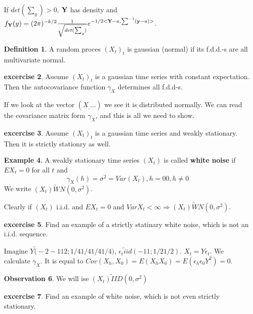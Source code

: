 \documentclass[12pt,a4paper]{amsart}
\theoremstyle{definition} %
\newtheorem{defn}{Definition}[section]
\newtheorem{example}[defn]{Example}
\newtheorem{excercise}[defn]{excercise}
\newtheorem{observation}[defn]{Observation}
\theoremstyle{plain} %
\begin{document}
If $det (\sum_y) > 0$, ${\bf Y}$ has density and $f_{\bf Y}(y) = (2 \pi)^{-k/2}\frac{1}{\sqrt{det(\sum_y)}} e^{-1/2<{\bf Y} - a, \sum^{-1}({\bf y} - a)>}$.

\begin{defn}
A random proces $(X_t)_t$ is gaussian (normal) if its f.d.d.-s are all multivariate normal.
\end{defn} 


\begin{excercise}
Assume $(X_t)_t$ is a gaussian time series with constant expectation. Then the autocovariance function $\gamma_X$ determines all f.d.d-s.

If we look at the vector $(X_, \dots)$ we see it is distributed normally. We can read the covariance matrix form $\gamma_X$, and this is all we need to show.
\end{excercise}

\begin{excercise}
Assume $(X_t)_t$ is a gaussian time series and weakly stationary. Then it is strictly stationry as well. 
\end{excercise}


\begin{example}
A weakly stationary time series $(X_t)$ is called {\bf white noise } if $EX_t = 0$ for all $t$ and 
$$\gamma_X(h) =  \sigma^2 = Var(X_t) ,h = 0
			0, h \neq 0
$$
We write $(X_t) \tilde WN(0, \sigma^2)$.

Clearly if $(X_t)$ i.i.d. and $EX_t = 0$ and $Var X_t < \infty \Rightarrow (X_t) \tilde WN(0, \sigma^2)$.  
\end{example}


\begin{excercise}
Find an example of a strictly statinary white noise, which is not an i.i.d. sequence.

Imagine $Y \tilde (-2 -1 1 2; 1/4 1/4 1/4 1/4)$, $\epsilon_t \tilde iid (-1 1; 1/2 1/2)$. $X_t = Y \epsilon_t$. We calculate $\gamma_X$. It is equal to $Cov(X_h, X_0) = E(X_h X_0) = E(\epsilon_h \epsilon_0 Y^2) = 0$.
\end{excercise}

\begin{observation}
We will ise $(X_t) \tilde IID(0, \sigma^2)$
\end{observation}

\begin{excercise}
Find an example of white noise, which is not even strictly stationary.
\end{excercise}
\end{document}
